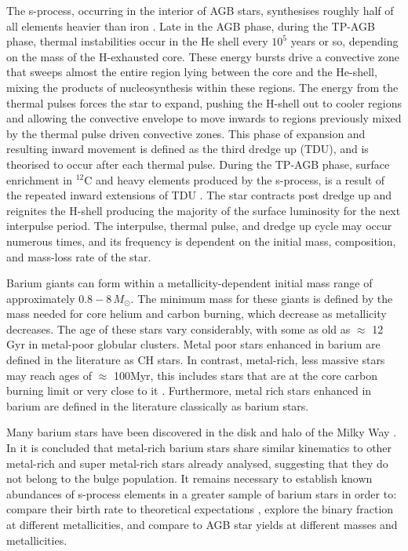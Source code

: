 \documentclass[a4paper,fleqn,usenatbib]{mnras}
\begin{document}
The s-process, occurring in the interior of AGB stars, synthesises roughly half of all elements heavier than iron \citep[e.g.,][]{busso1999,travaglio2001,herwig2005,bisterzo2014,karakas2014}. Late in the AGB phase, during the TP-AGB phase, thermal instabilities occur in the He shell every $10^5$ years or so, depending on the mass of the H-exhausted core. These energy bursts drive a convective zone that sweeps almost the entire region lying between the core and the He-shell, mixing the products of nucleosynthesis within these regions. The energy from the thermal pulses forces the star to expand, pushing the H-shell out to cooler regions and allowing the convective envelope to move inwards to regions previously mixed by the thermal pulse driven convective zones. This phase of expansion and resulting inward movement is defined as the third dredge up (TDU), and is theorised to occur after each thermal pulse. During the TP-AGB phase, surface enrichment in $^{12}$C and heavy elements produced by the s-process, is a result of the repeated inward extensions of TDU \citep[e.g.,][]{busso2001}. The star contracts post dredge up and reignites the H-shell producing the majority of the surface luminosity for the next interpulse period. The interpulse, thermal pulse, and dredge up cycle may occur numerous times, and its frequency is dependent on the initial mass, composition, and mass-loss rate of the star.

Barium giants can form within a metallicity-dependent initial mass range of approximately $0.8 - 8\,M_{\odot}$. The minimum mass for these giants is defined by the mass needed for core helium and carbon burning, which decrease as metallicity decreases. The age of these stars vary considerably, with some as old as $\approx$ 12\,Gyr in metal-poor globular clusters. Metal poor stars enhanced in barium are defined in the literature as CH stars. In contrast, metal-rich, less massive stars may reach ages of $\approx$ 100Myr, this includes stars that are at the core carbon burning limit or very close to it \citep[e.g.,][]{whitelock2013}. Furthermore, metal rich stars enhanced in barium are defined in the literature classically as barium stars.

Many barium stars have been discovered in the disk and halo of the Milky Way \citep{gomez1997,mennessier1997}. In \citet{pereira2011} it is concluded that metal-rich barium stars share similar kinematics to other metal-rich and super metal-rich stars already analysed, suggesting that they do not belong to the bulge population. It remains necessary to establish known abundances of s-process elements in a greater sample of barium stars in order to: compare their birth rate to theoretical expectations \citep{han1995}, explore the binary fraction at different metallicities, and compare to AGB star yields at different masses and metallicities.
\end{document}
